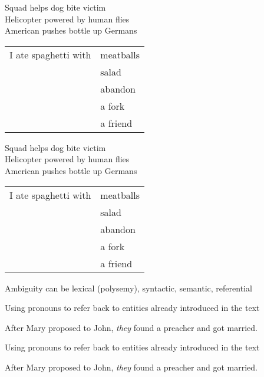 \documentclass{article}
\begin{document}
\begin{huge}

Squad helps dog bite victim \\
Helicopter powered by human flies\\
American pushes bottle up Germans\\
\begin{tabular}{ll}I ate spaghetti with & meatballs \\
                                        & salad \\
                                        & abandon \\
                                        & a fork \\
                                        & a friend 
\end{tabular}


Squad helps dog bite victim \\
Helicopter powered by human flies\\
American pushes bottle up Germans\\
\begin{tabular}{ll}I ate spaghetti with & meatballs \\
                                        & salad \\
                                        & abandon \\
                                        & a fork \\
                                        & a friend 
\end{tabular}

Ambiguity can be lexical (polysemy), syntactic, semantic, referential



Using pronouns to refer back to entities already introduced in the text

After Mary proposed to John, \emph{they} found a preacher and got married.


Using pronouns to refer back to entities already introduced in the text

After Mary proposed to John, \emph{they} found a preacher and got married.


\end{huge}
\end{document}
